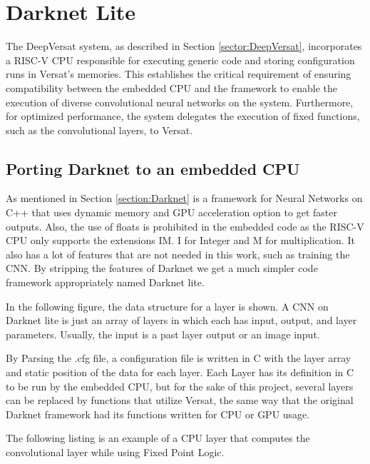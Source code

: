 \chapter{Darknet Lite}
\label{chapter:Darknet}


The DeepVersat system, as described in Section \ref{sector:DeepVersat}, incorporates a RISC-V CPU responsible for executing generic code and storing configuration runs in Versat's memories. 
This establishes the critical requirement of ensuring compatibility between the embedded CPU and the framework to enable the execution of diverse convolutional neural networks on the system. 
Furthermore, for optimized performance, the system delegates the execution of fixed functions, such as the convolutional layers, to Versat.

\section{Porting Darknet to an embedded CPU}

As mentioned in Section \ref{section:Darknet} is a framework for Neural Networks on C++ that uses dynamic memory and GPU acceleration option to get faster outputs.
Also, the use of floats is prohibited in the embedded code as the RISC-V CPU only supports the extensions IM. I for Integer and M for multiplication.
It also has a lot of features that are not needed in this work, such as training the CNN.
By stripping the features of Darknet we get a much simpler code framework appropriately named Darknet lite.

In the following figure, the data structure for a layer is shown. 
A CNN on Darknet lite is just an array of layers in which each has input, output, and layer parameters. 
Usually, the input is a past layer output or an image input.



By Parsing the .cfg file, a configuration file is written in C with the layer array and static position of the data for each layer. 
Each Layer has its definition in C to be run by the embedded CPU, but for the sake of this project, several layers can be replaced by functions that utilize Versat, the same way that the original Darknet framework had its functions written for CPU or GPU usage.

The following listing is an example of a CPU layer that computes the convolutional layer while using Fixed Point Logic.

